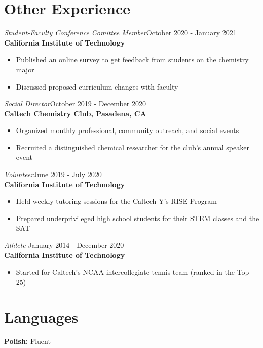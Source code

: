 \documentclass[margin,line]{resume}
\begin{document}
\begin{resume}
\section{\mysidestyle Other Experience}
{\sl Student-Faculty Conference Comittee Member}\hfill October 2020 - January 2021\\
\textbf{California Institute of Technology}
\begin{itemize}
\item Published an online survey to get feedback from students on the chemistry major
\item Discussed proposed curriculum changes with faculty
\end{itemize}
{\sl Social Director}\hfill October 2019 - December 2020\\
\textbf{Caltech Chemistry Club, Pasadena, CA}
\begin{itemize}
\item Organized monthly professional, community outreach, and social events
\item Recruited a distinguished chemical researcher for the club's annual speaker event
\end{itemize}
{\sl Volunteer}\hfill June 2019 - July 2020\\
\textbf{California Institute of Technology}
\begin{itemize}
\item Held weekly tutoring sessions for the Caltech Y's RISE Program
\item Prepared underprivileged high school students for their STEM classes and the SAT
\end{itemize}
{\sl Athlete} \hfill January 2014 - December 2020\\
\textbf{California Institute of Technology}
\begin{itemize}
\item Started for Caltech's NCAA intercollegiate tennis team (ranked in the Top 25)
\end{itemize}

\section{\mysidestyle Languages}
\textbf{Polish: }\textnormal{Fluent}


\end{resume}   
\end{document}
